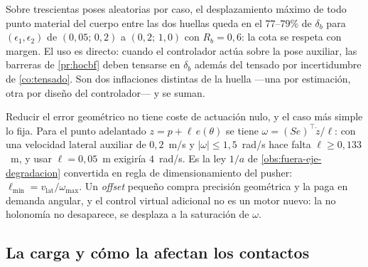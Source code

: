\begin{observacion}
\label{obs:huella-num}
Sobre trescientas poses aleatorias por caso, el desplazamiento máximo de todo
punto material del cuerpo entre las dos huellas queda en el $77$–$79\%$ de
$\delta_b$ para $(\epsilon_1,\epsilon_2)$ de $(0{,}05;\,0{,}2)$ a
$(0{,}2;\,1{,}0)$ con $R_b=0{,}6$: la cota se respeta con margen. El uso es
directo: cuando el controlador actúa sobre la pose auxiliar, las barreras de
\cref{pr:hocbf} deben tensarse en $\delta_b$ además del tensado por incertidumbre
de \cref{co:tensado}. Son dos inflaciones distintas de la huella —una por
estimación, otra por diseño del controlador— y se suman.
\end{observacion}

\begin{observacion}
\label{obs:mando-grande}
Reducir el error geométrico no tiene coste de actuación nulo, y el caso más
simple lo fija. Para el punto adelantado $z=p+\ell\,e(\theta)$ se tiene
$\omega=(Se)^{\!\top}\dot z/\ell$: con una velocidad lateral auxiliar de
$0{,}2$~m/s y $|\omega|\le1{,}5$~rad/s hace falta $\ell\ge0{,}133$~m, y usar
$\ell=0{,}05$~m exigiría $4$~rad/s. Es la ley $1/a$ de
\cref{obs:fuera-eje-degradacion} convertida en regla de dimensionamiento del
pusher: $\ell_{\min}=v_{\mathrm{lat}}/\omega_{\max}$. Un \emph{offset} pequeño
compra precisión geométrica y la paga en demanda angular, y el control virtual
adicional no es un motor nuevo: la no holonomía no desaparece, se desplaza a la
saturación de $\omega$.
\end{observacion}

\figAMR

\subsection{La carga y cómo la afectan los contactos}

